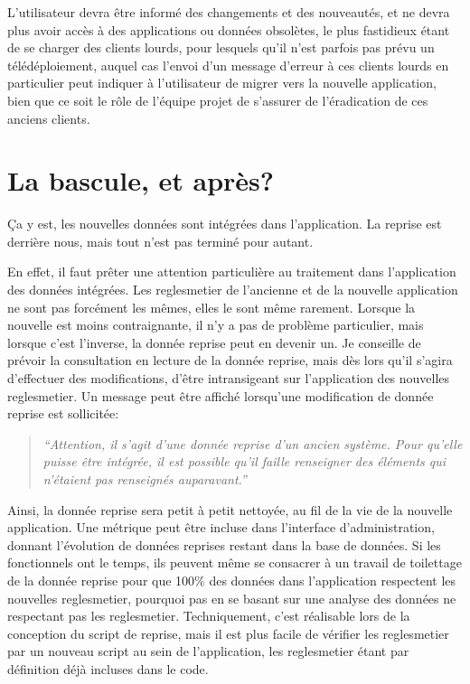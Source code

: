 \documentclass{book}
\begin{document}
L'utilisateur devra être informé des changements et des nouveautés, et ne devra plus avoir accès à des applications ou données obsolètes, le plus fastidieux étant de se charger des \gls{client}s lourds, pour lesquels qu'il n'est parfois pas prévu un télédéploiement, auquel cas l'envoi d'un message d'erreur à ces \gls{client}s lourds en particulier peut indiquer à l'utilisateur de migrer vers la nouvelle application, bien que ce soit le rôle de l'équipe projet de s'assurer de l'éradication de ces anciens \gls{client}s.
	
\section{La bascule, et après?}

Ça y est, les nouvelles données sont intégrées dans l'application. La reprise est derrière nous, mais tout n'est pas terminé pour autant.

En effet, il faut prêter une attention particulière au traitement dans l'application des données intégrées. Les \gls{reglesmetier} de l'ancienne et de la nouvelle application ne sont pas forcément les mêmes, elles le sont même rarement. Lorsque la nouvelle est moins contraignante, il n'y a pas de problème particulier, mais lorsque c'est l'inverse, la donnée reprise peut en devenir un. Je conseille de prévoir la consultation en lecture de la donnée reprise, mais dès lors qu'il s'agira d'effectuer des modifications, d'être intransigeant sur l'application des nouvelles \gls{reglesmetier}. Un message peut être affiché lorsqu'une modification de donnée reprise est sollicitée:
\begin{quotation}
\textit{``Attention, il s'agit d'une donnée reprise d'un ancien système. Pour qu'elle puisse être intégrée, il est possible qu'il faille renseigner des éléments qui n'étaient pas renseignés auparavant.''}
\end{quotation}


Ainsi, la donnée reprise sera petit à petit nettoyée, au fil de la vie de la nouvelle application. Une métrique peut être incluse dans l'interface d'administration, donnant l'évolution de données reprises restant dans la base de données. Si les \gls{fonctionnels} ont le temps, ils peuvent même se consacrer à un travail de toilettage de la donnée reprise pour que 100\% des données dans l'application respectent les nouvelles \gls{reglesmetier}, pourquoi pas en se basant sur une analyse des données ne respectant pas les \gls{reglesmetier}. Techniquement, c'est réalisable lors de la conception du script de reprise, mais il est plus facile de vérifier les \gls{reglesmetier} par un nouveau script au sein de l'application, les \gls{reglesmetier} étant par définition déjà incluses dans le code.
\end{document}
